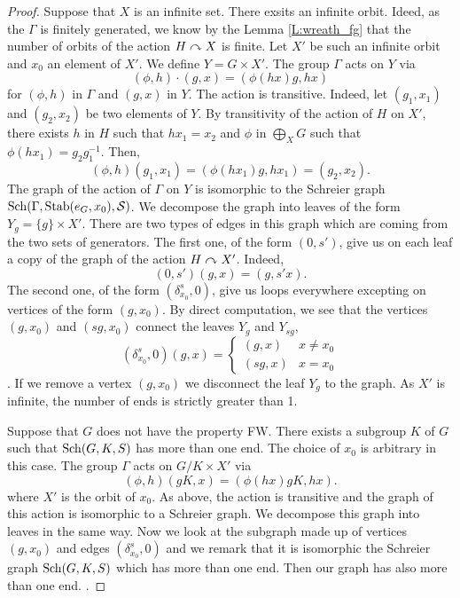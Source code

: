 \begin{lem}
\begin{proof}
Suppose that $X$ is an infinite set. There exsits an infinite orbit. Ideed, as the $\Gamma$ is finitely generated, we know by the Lemma \ref{L:wreath_fg} that the number of orbits of the action $H \curvearrowright X$ is finite. Let $X'$ be such an infinite orbit and $x_0$ an element of $X'$. We define $Y = G \times X'$. The group $\Gamma$ acts on $Y$ via
\begin{equation*}
(\phi,h) \cdot (g,x) = (\phi(hx)g, hx)
\end{equation*}
for $(\phi,h)$ in $\Gamma$ and $(g,x)$ in $Y$. The action is transitive. Indeed, let $(g_1,x_1)$ and $(g_2,x_2)$ be two elements of $Y$. By transitivity of the action of $H$ on $X'$, there exists $h$ in $H$ such that $hx_1 = x_2$ and $\phi$ in $\bigoplus_X G$ such that $\phi(hx_1) = g_2g_1^{-1}$. Then, 
\begin{equation*}
(\phi,h) (g_1,x_1) = (\phi(h x_1) g, h x_1) = (g_2,x_2).
\end{equation*}
The graph of the action of $\Gamma$ on $Y$ is isomorphic to the Schreier graph $\operatorname{Sch}(\Gamma, \operatorname{Stab}(e_G,x_0), \mathcal{S})$. We decompose the graph into leaves of the form $Y_g = \{ g \} \times X'$. There are two types of edges in this graph which are coming from the two sets of generators. The first one, of the form $(0,s')$, give us on each leaf a copy of the graph of the action $H \curvearrowright X'$. Indeed,
\begin{equation*}
(0,s')(g,x) = (g, s'x).
\end{equation*}
The second one, of the form $(\delta_{x_0}^s,0)$, give us loops everywhere excepting on vertices of the form $(g,x_0)$. By direct computation, we see that the vertices $(g,x_0)$ and $(sg,x_0)$ connect the leaves $Y_g$ and $Y_{sg}$, 
\begin{equation*}
(\delta_{x_0}^s,0)(g,x) = 
\begin{cases}
(g,x) & x \neq x_0 \\
(sg, x) & x = x_0
\end{cases}
\end{equation*}
.
If we remove a vertex $(g,x_0)$ we disconnect the leaf $Y_g$ to the graph. As $X'$ is infinite, the number of ends is strictly greater than 1.

Suppose that $G$ does not have the property FW. There exists a subgroup $K$ of $G$ such that $\operatorname{Sch}(G,K,S)$ has more than one end. The choice of $x_0$ is arbitrary in this case. The group $\Gamma$ acts on $G/K \times X'$ via  
\begin{equation*}
(\phi,h)(gK,x) = (\phi(hx) gK, hx).
\end{equation*}
where $X'$ is the orbit of $x_0$. As above, the action is transitive and the graph of this action is isomorphic to a Schreier graph. We decompose this graph into leaves in the same way. Now we look at the subgraph made up of vertices $(g,x_0)$ and edges $(\delta_{x_0}^s,0)$ and we remark that it is isomorphic the Schreier graph $\operatorname{Sch}(G,K,S)$ which has more than one end. Then our graph has also more than one end.
.


\end{proof}
\end{lem}
